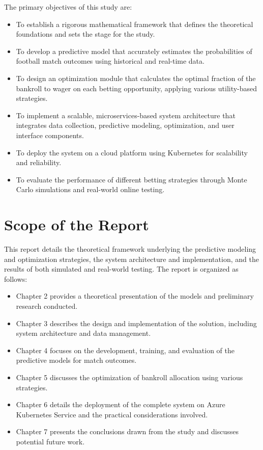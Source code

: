 The primary objectives of this study are:

\begin{itemize}
\item To establish a rigorous mathematical framework that defines the theoretical foundations and sets the stage for the study.
\item To develop a predictive model that accurately estimates the probabilities of football match outcomes using historical and real-time data. \item To design an optimization module that calculates the optimal fraction of the bankroll to wager on each betting opportunity, applying various utility-based strategies. \item To implement a scalable, microservices-based system architecture that integrates data collection, predictive modeling, optimization, and user interface components. \item To deploy the system on a cloud platform using Kubernetes for scalability and reliability. \item To evaluate the performance of different betting strategies through Monte Carlo simulations and real-world online testing. \end{itemize}

\section{Scope of the Report}

This report details the theoretical framework underlying the predictive modeling and optimization strategies, the system architecture and implementation, and the results of both simulated and real-world testing. The report is organized as follows:

\begin{itemize} \item Chapter 2 provides a theoretical presentation of the models and preliminary research conducted. \item Chapter 3 describes the design and implementation of the solution, including system architecture and data management. \item Chapter 4 focuses on the development, training, and evaluation of the predictive models for match outcomes. \item Chapter 5 discusses the optimization of bankroll allocation using various strategies. \item Chapter 6 details the deployment of the complete system on Azure Kubernetes Service and the practical considerations involved. \item Chapter 7 presents the conclusions drawn from the study and discusses potential future work. \end{itemize}

